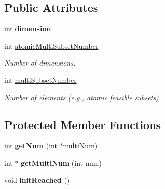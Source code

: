 \subsection*{Public Attributes}
\begin{DoxyCompactItemize}
\item 
\hypertarget{classMultiSet_a1a49a7a8c3d0db003198312c3bd541af}{int {\bfseries dimension}}\label{classMultiSet_a1a49a7a8c3d0db003198312c3bd541af}

\item 
\hypertarget{classMultiSet_a3084e5afaa18d1f19a38f7139f827cfc}{int \hyperlink{classMultiSet_a3084e5afaa18d1f19a38f7139f827cfc}{atomic\-Multi\-Subset\-Number}}\label{classMultiSet_a3084e5afaa18d1f19a38f7139f827cfc}

\begin{DoxyCompactList}\small\item\em Number of dimensions. \end{DoxyCompactList}\item 
\hypertarget{classMultiSet_a9c0c781a33f40bb2cd28110805572b7a}{int \hyperlink{classMultiSet_a9c0c781a33f40bb2cd28110805572b7a}{multi\-Subset\-Number}}\label{classMultiSet_a9c0c781a33f40bb2cd28110805572b7a}

\begin{DoxyCompactList}\small\item\em Number of elements (e.\-g., atomic feasible subsets) \end{DoxyCompactList}\end{DoxyCompactItemize}
\subsection*{Protected Member Functions}
\begin{DoxyCompactItemize}
\item 
\hypertarget{classMultiSet_a733d943fe9d2b3adea8a4bb428dead2f}{int {\bfseries get\-Num} (int $\ast$multi\-Num)}\label{classMultiSet_a733d943fe9d2b3adea8a4bb428dead2f}

\item 
\hypertarget{classMultiSet_a800300d40d19af10748df98a98fdd890}{int $\ast$ {\bfseries get\-Multi\-Num} (int num)}\label{classMultiSet_a800300d40d19af10748df98a98fdd890}

\item 
\hypertarget{classMultiSet_a75aafafabb07c7cc5f155fe18dded266}{void {\bfseries init\-Reached} ()}\label{classMultiSet_a75aafafabb07c7cc5f155fe18dded266}

\end{DoxyCompactItemize}
